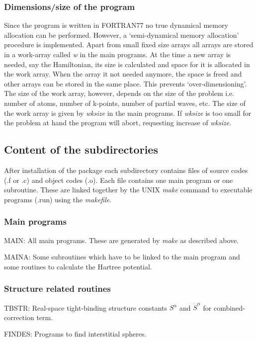 \documentclass[aps,twocolumn,a4]{revtex4}
\begin{document}
\subsubsection{Dimensions/size of the program}
\label{dim}

Since the program is written in FORTRAN77 no true dynamical memory
allocation can be performed.  However, a `semi-dynamical memory
allocation' procedure is implemented.  Apart from small fixed size
arrays all arrays are stored in a work-array called {\em w} in the main
programs.  At the time a new array is needed, say the Hamiltonian, its
size is calculated and space for it is allocated in the work array.
When the array it not needed anymore, the space is freed and other arrays
can be stored in the same place.  This prevents `over-dimensioning'.
The size of the work array, however, depends on the size of the problem
i.e. number of atoms, number of k-points, number of partial waves, etc.
The size of the work array is given by {\em wksize} in the main
programs.  If {\em wksize} is too small for the problem at
hand the program will abort, requesting increase of {\em wksize}.

\subsection{Content of the subdirectories}
After installation of the package each subdirectory contains files of
source codes (.f or .c) and object codes (.o). Each file contains one
main program or one subroutine. These are linked together by the UNIX
{\em make} command to executable programs (.run) using the {\em
makefile}.
\subsubsection{Main programs}

MAIN: All main programs. These are generated by {\em make} as described
above.

MAINA: Some subroutines which have to be linked to the main program
and some routines to calculate the Hartree potential.

\subsubsection{Structure related routines}

TBSTR: Real-space tight-binding structure constants
$S^\alpha $ and $\dot S^\alpha $ for combined-correction term.

FINDES: Programs to find interstitial spheres.
\end{document}
